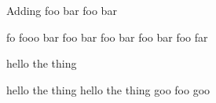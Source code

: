 Adding foo bar foo bar

fo fooo bar foo bar foo bar foo bar foo far

hello the thing

hello the thing hello the thing goo foo goo 